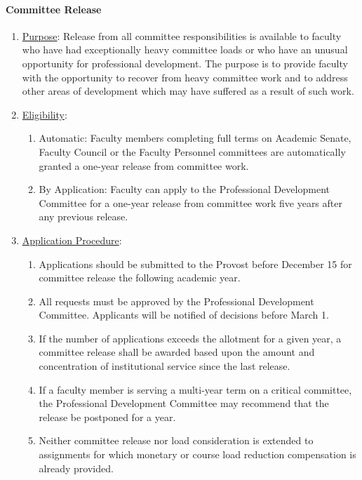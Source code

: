 			\paragraph{Committee Release}
				\label{sec:CommitteeRelease}
				\begin{enumerate}[label=\alph*)]
					\item{\underline{Purpose}:  Release from all committee responsibilities is available to faculty who have had exceptionally heavy committee loads or who have an unusual opportunity for professional development.  The purpose is to provide faculty with the opportunity to recover from heavy committee work and to address other areas of development which may have suffered as a result of such work.}
					\item{\underline{Eligibility}:
						\begin{enumerate}[label=\arabic*)]
							\label{sec:CommitteeRelease-Eligibility}
							\item{
								\label{sec:CommitteeRelease-Eligibility-Automatic}
								Automatic:  Faculty members completing full terms on Academic Senate, Faculty Council or the Faculty Personnel committees are automatically granted a one-year release from committee work.}
							\item{By Application:  Faculty can apply to the Professional Development Committee for a one-year release from committee work five years after any previous release.}
						\end{enumerate}
					}
					\item{\underline{Application Procedure}:
						\begin{enumerate}[label=\arabic*)]
							\item{Applications should be submitted to the Provost before December 15 for committee release the following academic year.}
							\item{All requests must be approved by the Professional Development Committee.  Applicants will be notified of decisions before March 1.}
							\item{If the number of applications exceeds the allotment for a given year, a committee release shall be awarded based upon the amount and concentration of institutional service since the last release.}
							\item{If a faculty member is serving a multi-year term on a critical committee, the Professional Development Committee may recommend that the release be postponed for a year.}
							\item{Neither committee release nor load consideration is extended to assignments for which monetary or course load reduction compensation is already provided.}
						\end{enumerate}
					}
				\end{enumerate}

